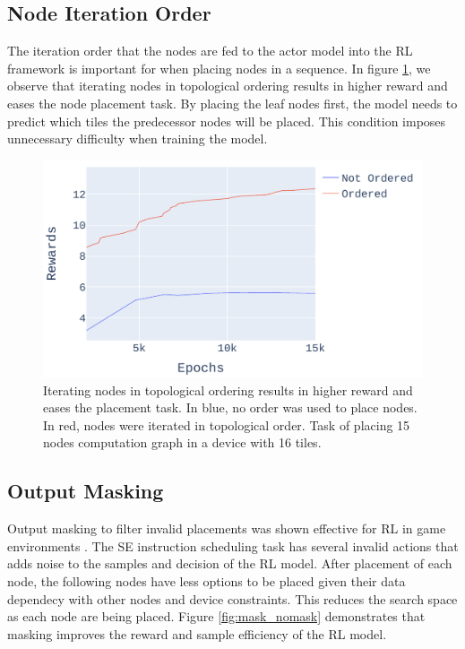 \subsection{Node Iteration Order}

The iteration order that the nodes are fed to the actor model into the RL framework is important for when placing 
nodes in a sequence. In figure \ref{fig:ordered_placement}, we observe that iterating nodes in topological 
ordering results in higher reward and eases the node placement task. By placing the leaf nodes first, the model needs
to predict which tiles the predecessor nodes will be placed. This condition imposes unnecessary difficulty when training the model.

\begin{figure}[h]
  \centering
  \includegraphics[width=\linewidth]{fig/plot_ordered.pdf}
  \caption{Iterating nodes in topological ordering results in higher reward and eases the placement task. 
  In blue, no order was used to place nodes. In red, nodes were iterated in topological order. 
  Task of placing 15 nodes computation graph in a device with 16 tiles.}
  \label{fig:ordered_placement}
\end{figure}


\subsection{Output Masking}

Output masking to filter invalid placements was shown effective for RL in game environments \cite{Shengyi_mask}. 
The SE instruction scheduling task has several invalid actions that adds noise to the samples and decision of the RL model. 
After placement of each node, the following nodes have less options to be placed given their data dependecy with other nodes and device constraints.
This reduces the search space as each node are being placed. 
Figure \ref{fig:mask_nomask} demonstrates that masking improves the reward and sample efficiency of the RL model.

